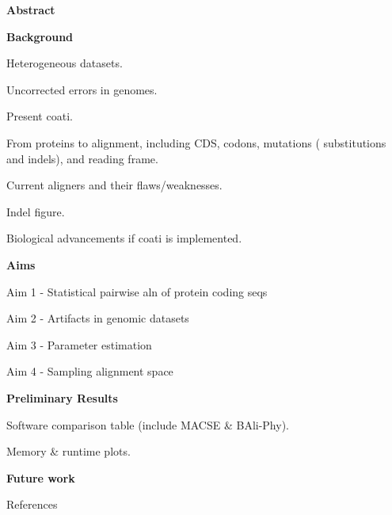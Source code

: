 
\usepackage{outline}


\begin{outline}
	\item \textbf{Abstract}
	\item \textbf{Background}
	\begin{outline}
		\item Heterogeneous datasets.
		\item Uncorrected errors in genomes.
		\item Present coati.
		\item From proteins to alignment, including CDS, codons, mutations (
			substitutions and indels), and reading frame.
		\item Current aligners and their flaws/weaknesses.
		\item Indel figure.
		\item Biological advancements if coati is implemented.
	\end{outline}
	\item \textbf{Aims}
	\begin{outline}
		\item Aim 1 - Statistical pairwise aln of protein coding seqs %
		\item Aim 2 - Artifacts in genomic datasets  %
		\item Aim 3 - Parameter estimation           %
		\item Aim 4 - Sampling alignment space 	 	 %
	\end{outline}
	\item \textbf{Preliminary Results}
	\begin{outline}
		\item Software comparison table (include MACSE \& BAli-Phy).
		\item Memory \& runtime plots.
	\end{outline}
	\item \textbf{Future work}
	\item References
\end{outline}

